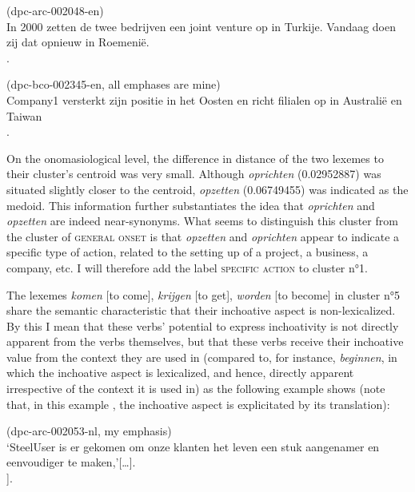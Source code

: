 \ea (dpc-arc-002048-en)\label{ex:10}\\
In 2000 zetten de twee bedrijven een joint venture op in Turkije. Vandaag doen zij dat opnieuw in Roemenië.\\.
\z

\ea (dpc-bco-002345-en, all emphases are mine)\label{ex:11}\\
Company1 versterkt zijn positie in het Oosten en richt filialen op in Australië en Taiwan\\.
\z

On the onomasiological level, the difference in distance of the two lexemes to their cluster’s centroid was very small. Although \textit{oprichten} (0.02952887) was situated slightly closer to the centroid, \textit{opzetten} (0.06749455) was indicated as the medoid. This information further substantiates the idea that \textit{oprichten} and \textit{opzetten} are indeed near-synonyms. What seems to distinguish this cluster from the cluster of \textsc{general onset} is that \textit{opzetten} and \textit{oprichten} appear to indicate a specific type of action, related to the setting up of a project, a business, a company, etc. I will therefore add the label \textsc{specific} \textsc{action} to cluster n°1.

The lexemes \textit{komen} [to come], \textit{krijgen} [to get], \textit{worden} [to become] in cluster n°5 share the semantic characteristic that their inchoative aspect is non-lexicalized. By this I mean that these verbs’ potential to express inchoativity is not directly apparent from the verbs themselves, but that these verbs receive their inchoative value from the context they are used in (compared to, for instance, \textit{beginnen}, in which the inchoative aspect is lexicalized, and hence, directly apparent irrespective of the context it is used in) as the following example shows (note that, in this example , the inchoative aspect is explicitated by its translation):

\ea\label{ex:12}(dpc-arc-002053-nl, my emphasis)\\
`SteelUser is er gekomen om onze klanten het leven een stuk aangenamer en eenvoudiger te maken,'[…].\\\relax
[\textsc{target}: "SteelUser was set up to make life simpler and more comfortable for our clients," [...] ].
\z

